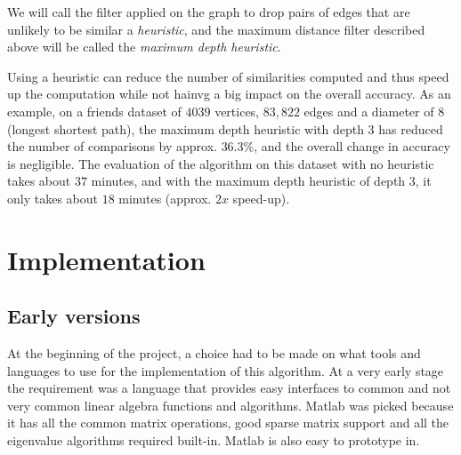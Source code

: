 \documentclass[12pt]{report}
\begin{document}
We will call the filter applied on the graph to drop pairs of edges that are
unlikely to be similar a \emph{heuristic}, and the maximum distance filter
described above will be called the \emph{maximum depth heuristic}.


Using a heuristic can reduce the number of similarities computed and thus speed
up the computation while not hainvg a big impact on the overall accuracy. As an
example, on a friends dataset of $4039$ vertices, $83,822$ edges and a diameter
of $8$ (longest shortest path), the maximum depth heuristic with depth 3 has
reduced the number of comparisons by approx. $36.3\%$, and the overall change in
accuracy is negligible. The evaluation of the algorithm on this dataset with no
heuristic takes about $37$ minutes, and with the maximum depth heuristic of depth
$3$, it only takes about $18$ minutes (approx. $2x$ speed-up).

%
%
\section{Implementation}
%


\newenvironment{methodListC}[2]{
  \newcommand{\mtd}[2]{\texttt{##1} & ##2 \\}
  \newcommand{\mtdfootCaption}{#2}
  \newcommand{\mtdfootLabel}{#1}
  \begin{table}[!ht]
    \centering
    \begin{tabular}{lp{10cm}}
}{
\end{tabular}
\caption{\mtdfootCaption}
\label{\mtdfootLabel}
\end{table}
}

\newenvironment{methodList}{
  \newcommand{\mtd}[2]{\texttt{##1} & ##2 \\}
  \begin{table}[!ht]
    \centering
    \begin{tabular}{lp{10cm}}
}{
\end{tabular}
\end{table}
}

\subsection{Early versions}

At the beginning of the project, a choice had to be made on what tools and
languages to use for the implementation of this algorithm. At a very early stage
the requirement was a language that provides easy interfaces to common and not
very common linear algebra functions and algorithms. Matlab was picked because
it has all the common matrix operations, good sparse matrix support and all the
eigenvalue algorithms required built-in. Matlab is also easy to prototype in.
\end{document}
